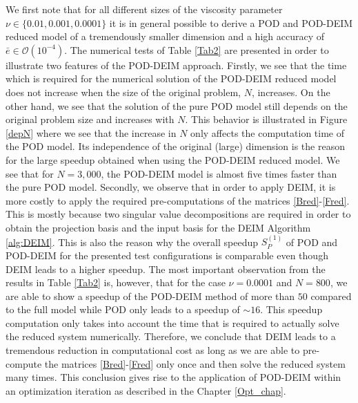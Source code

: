 We first note that for all different sizes of the viscosity parameter $\nu \in \{0.01, 0.001, 0.0001\}$ it is in general possible to derive a POD and POD-DEIM reduced model of a tremendously smaller dimension and a high accuracy of $\bar{e} \in \mathcal{O}(10^{-4})$. The numerical tests of Table \ref{Tab2} are presented in order to illustrate two features of the POD-DEIM approach. Firstly, we see that the time which is required for the numerical solution of the POD-DEIM reduced model does not increase when the size of the original problem, $N$, increases. On the other hand, we see that the solution of the pure POD model still depends on the original problem size and increases with $N$. This behavior is illustrated in Figure \ref{depN} where we see that the increase in $N$ only affects the computation time of the POD model. Its independence of the original (large) dimension is the reason for the large speedup obtained when using the POD-DEIM reduced model. We see that for $N=3,000$, the POD-DEIM model is almost five times faster than the pure POD model. Secondly, we observe that in order to apply DEIM, it is more costly to apply the required pre-computations of the matrices \eqref{Bred}-\eqref{Fred}. This is mostly because two singular value decompositions are required in order to obtain the projection basis and the input basis for the DEIM Algorithm \ref{alg:DEIM}. This is also the reason why the overall speedup $S_P^{(1)}$ of POD and POD-DEIM for the presented test configurations is comparable even though DEIM leads to a higher speedup. The most important observation from the results in Table \ref{Tab2} is, however, that for the case $\nu = 0.0001$ and $N = 800$, we are able to show a speedup of the POD-DEIM method of more than $50$ compared to the full model while POD only leads to a speedup of $\sim \! 16$. This speedup computation only takes into account the time that is required to actually solve the reduced system numerically. Therefore, we conclude that DEIM leads to a tremendous reduction in computational cost as long as we are able to pre-compute the matrices \eqref{Bred}-\eqref{Fred} only once and then solve the reduced system many times. This conclusion gives rise to the application of POD-DEIM within an optimization iteration as described in the Chapter \ref{Opt_chap}.
